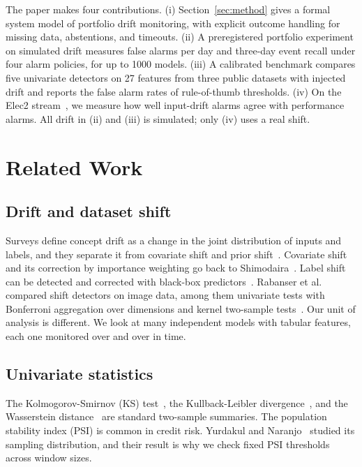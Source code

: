 \documentclass[journal]{IEEEtran}
\begin{document}
The paper makes four contributions. (i) Section~\ref{sec:method} gives a formal system model of portfolio drift monitoring, with explicit outcome handling for missing data, abstentions, and timeouts. (ii) A preregistered portfolio experiment on simulated drift measures false alarms per day and three-day event recall under four alarm policies, for up to 1000 models. (iii) A calibrated benchmark compares five univariate detectors on 27 features from three public datasets with injected drift and reports the false alarm rates of rule-of-thumb thresholds. (iv) On the Elec2 stream~\cite{elec2}, we measure how well input-drift alarms agree with performance alarms. All drift in (ii) and (iii) is simulated; only (iv) uses a real shift.

\section{Related Work}
\label{sec:related}

\subsection{Drift and dataset shift}

Surveys define concept drift as a change in the joint distribution of inputs and labels, and they separate it from covariate shift and prior shift~\cite{gama2014,lu2019,webb2016,moreno2012,zliobaite2010}. Covariate shift and its correction by importance weighting go back to Shimodaira~\cite{shimodaira2000}. Label shift can be detected and corrected with black-box predictors~\cite{lipton2018}. Rabanser et al.~\cite{rabanser2019} compared shift detectors on image data, among them univariate tests with Bonferroni aggregation over dimensions and kernel two-sample tests~\cite{gretton2008}. Our unit of analysis is different. We look at many independent models with tabular features, each one monitored over and over in time.

\subsection{Univariate statistics}

The Kolmogorov-Smirnov (KS) test~\cite{massey1951}, the Kullback-Leibler divergence~\cite{kullback1951}, and the Wasserstein distance~\cite{ramdas2017} are standard two-sample summaries. The population stability index (PSI) is common in credit risk. Yurdakul and Naranjo~\cite{yurdakul2020} studied its sampling distribution, and their result is why we check fixed PSI thresholds across window sizes.
\end{document}
